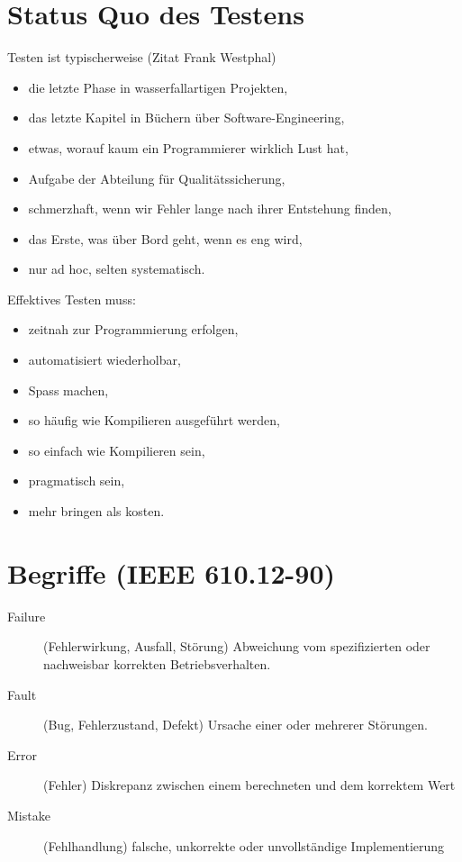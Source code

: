 \section{Status Quo des Testens}
Testen ist typischerweise (Zitat Frank Westphal)
\begin{itemize}
\item  die letzte Phase in wasserfallartigen Projekten,
\item das letzte Kapitel in Büchern über Software-Engineering,
\item etwas, worauf kaum ein Programmierer wirklich Lust hat,
\item Aufgabe der Abteilung für Qualitätssicherung,
\item schmerzhaft, wenn wir Fehler lange nach ihrer Entstehung finden,
\item das Erste, was über Bord geht, wenn es eng wird,
\item nur ad hoc, selten systematisch.
\end{itemize}
\newslide
Effektives Testen muss:
\begin{itemize}
\item zeitnah zur Programmierung erfolgen,
\item automatisiert wiederholbar,
\item Spass machen,
\item so häufig wie Kompilieren ausgeführt werden,
\item so einfach wie Kompilieren sein,
\item pragmatisch sein,
\item mehr bringen als kosten.
\end{itemize}
\newslide
\section{Begriffe (IEEE 610.12-90)}
\begin{description}
\item[Failure] (Fehlerwirkung, Ausfall, Störung)
   Abweichung vom spezifizierten oder nachweisbar korrekten Betriebsverhalten.
 \item[Fault] (Bug, Fehlerzustand, Defekt)
   Ursache einer oder mehrerer Störungen.
 \item[Error] (Fehler)
   Diskrepanz zwischen einem berechneten und dem korrektem Wert
 \item[Mistake] (Fehlhandlung)
   falsche, unkorrekte oder unvollständige Implementierung
\end{description}
\ifslides
\newpage
\fi
%
